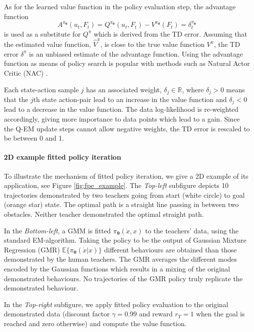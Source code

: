 \documentclass[final,5p,times,twocolumn]{elsarticle}
\newcommand{\X}{x}
\newcommand{\U}{\dot{x}}
\newcommand{\Param}{\boldsymbol{\theta}}
\begin{document}
As for the learned value function in the policy evaluation step, the advantage function
\begin{equation}\label{eq:advantage_f}
 A^{\pi_{\Param}}(u_t,F_t) =  Q^{\pi_{\Param}}(u_t,F_t) - V^{\pi_{\Param}}(F_t) = \delta^{\pi_{\Param}}_t
\end{equation}
is used as a substitute for $Q^{\pi}$ which is derived from the TD error. Assuming that the estimated 
value function, $\hat{V}^{\pi}$, is close to the true value function $V^{\pi}$, the 
TD error $\delta^{\pi}$ is an unbiased estimate of the advantage function. Using the 
advantage function as means of policy search is popular with methods such as Natural Actor Critic (NAC) \cite{peter_nac_2008}.

Each state-action sample $j$ has an associated weight, $\delta_j \in \mathbb{R}$, where $\delta_j > 0$ means that the 
$j$th state action-pair lead to an increase in the value function and $\delta_j < 0$ lead to 
a decrease in the value function. The data log-likelihood is re-weighted accordingly, giving more importance to data points which lead to a gain. Since 
the Q-EM update steps cannot allow negative weights, the TD error is rescaled to be between 0 and 1. 


\paragraph{2D example fitted policy iteration}

To illustrate the mechanism of fitted policy iteration, we give a 2D example 
of its application, see Figure \ref{fig:fpe_example}. The \textit{Top-left} subfigure
depicts 10 trajectories demonstrated by two teachers going from start (white circle) to goal (orange star) state. 
The optimal path is a straight line passing in between two obstacles. 
Neither teacher demonstrated the optimal straight path. 

In the \textit{Bottom-left}, a GMM is fitted $\pi_{\Param}(\U,\X)$ to the teachers' data, using the standard EM-algorithm.
Taking the policy to be the output of Gaussian Mixture Regression (GMR) $\mathbb{E}\{\pi_{\Param}(\U|\X)\}$ different
behaviours are obtained than those demonstrated by the human teachers. The GMR averages the different modes encoded by the Gaussian functions 
which results in a mixing of the original demonstrated behaviours. No trajectories of the GMR policy truly replicate 
the demonstrated behaviour. 

In the \textit{Top-right} subfigure, we apply fitted policy evaluation to the original demonstrated data (discount 
factor $\gamma=0.99$ and reward $r_{T}=1$ when the goal is reached and zero otherwise) and compute the value function.
\end{document}
